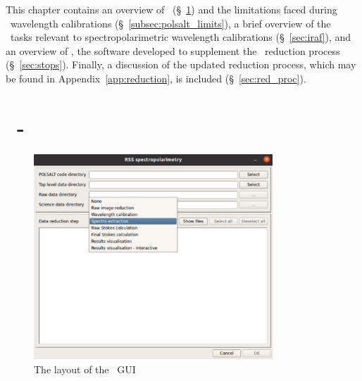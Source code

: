 
This chapter contains an overview of \polsalt\ (\S~\ref{sec:polsalt}) and the limitations faced during \polsalt\ wavelength calibrations (\S~\ref{subsec:polsalt_limits}), a brief overview of the \iraf\ tasks relevant to spectropolarimetric wavelength calibrations (\S~\ref{sec:iraf}), and an overview of \stops, the software developed to supplement the \polsalt\ reduction process (\S~\ref{sec:stops}). Finally, a discussion of the updated reduction process, which may be found in Appendix~\ref{app:reduction}, is included (\S~\ref{sec:red_proc}).

\section[\polsalt]{\polsalt\ - } \label{sec:polsalt}

\begin{figure}[t]
    \centering
    \includegraphics[width = 0.8\textwidth]{figures/2_polsalt_gui.png}
    \caption{The layout of the \polsalt\ \gls{GUI}}
    \label{fig:polsalt_gui}
\end{figure}

